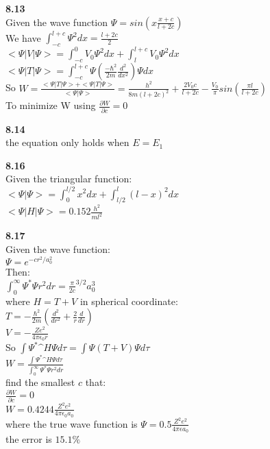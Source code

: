\documentclass{article}
\begin{document}
\textbf{8.13}\\
Given the wave function $\Psi = sin(x\frac{x+c}{l+2c})$\\
We have $\int_{-c}^{l+c}\Psi^2dx = \frac{l+2c}{2}$\\
$<\Psi|V|\Psi> = \int_{-c}^0V_0\Psi^2dx + \int_l^{l+c}V_0\Psi^2dx$\\
$<\Psi|T|\Psi> = \int_{-c}^{l+c}\Psi(\frac{-\hbar^2}{2m}\frac{d^2}{dx^2})\Psi dx$\\
So $W = \frac{<\Psi|T|\Psi>+<\Psi|T|\Psi>}{<\Psi|\Psi>} = \frac{h^2}{8m(l+2c)^2}+\frac{2V_0c}{l+2c}-\frac{V_0}{\pi}sin(\frac{\pi l}{l + 2c})$\\
To minimize W using $\frac{\partial W}{\partial c} = 0$\\
\newline

\textbf{8.14}\\
the equation only holds when $E = E_1$\\
\newline

\textbf{8.16}\\
Given the triangular function:\\
$<\Psi|\Psi> = \int_0^{l/2}x^2dx+\int_{l/2}^l (l-x)^2dx$\\
$<\Psi|H|\Psi> = 0.152\frac{h^2}{ml^2}$\\
\newline

\textbf{8.17}\\
Given the wave function:\\
$\Psi = e^{-cr^2/a_0^2}$\\
Then:\\
$\int_0^{\infty}\Psi^*\Psi r^2dr = \frac{\pi}{2c}^{3/2}a_0^3$\\
where $H = T + V$ in spherical coordinate:\\
$T = -\frac{\hbar^2}{2m}(\frac{d^2}{dr^2}+\frac{2}{r}\frac{d}{dr})$\\
$V = -\frac{Ze^2}{4\pi \epsilon_0 r}$\\
So $\int \Psi^* \^{H}\Psi d\tau = \int \Psi (T+V)\Psi d\tau$\\
$W = \frac{\int \Psi^* \^{H}\Psi d\tau}{\int_0^{\infty}\Psi^*\Psi r^2dr} $\\
find the smallest $c$ that:\\
$\frac{\partial W}{\partial c} = 0$\\
$W = 0.4244\frac{Z^2e^2}{4\pi \epsilon_0 a_0}$\\
where the true wave function is $\Psi = 0.5\frac{Z^2e^2}{4\pi \epsilon a_0}$\\
the error is $15.1\%$\\
\newline
\end{document}
